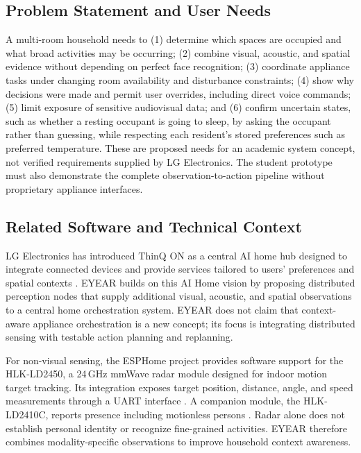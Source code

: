 \documentclass[conference]{IEEEtran}
\begin{document}
\subsection{Problem Statement and User Needs}

A multi-room household needs to (1) determine which spaces are
occupied and what broad activities may be occurring; (2) combine
visual, acoustic, and spatial evidence without depending on
perfect face recognition; (3) coordinate appliance tasks under
changing room availability and disturbance constraints;
(4) show why decisions were made and permit user overrides,
including direct voice commands; (5) limit exposure of sensitive
audiovisual data; and (6) confirm uncertain states, such as whether
a resting occupant is going to sleep, by asking the occupant
rather than guessing, while respecting each resident's stored
preferences such as preferred temperature. These are proposed
needs for an academic system concept, not verified requirements
supplied by LG Electronics. The student prototype must also
demonstrate the complete observation-to-action pipeline without
proprietary appliance interfaces.

\subsection{Related Software and Technical Context}

LG Electronics has introduced ThinQ ON as a central AI home hub
designed to integrate connected devices and provide services
tailored to users' preferences and spatial contexts
\cite{lg2024}. EYEAR builds on this AI Home vision by proposing
distributed perception nodes that supply additional visual,
acoustic, and spatial observations to a central home
orchestration system. EYEAR does not claim that context-aware
appliance orchestration is a new concept; its focus is integrating
distributed sensing with testable action planning and replanning.

For non-visual sensing, the ESPHome project provides software
support for the HLK-LD2450, a 24\,GHz mmWave radar module designed
for indoor motion target tracking. Its integration exposes target
position, distance, angle, and speed measurements through a UART
interface \cite{esphome_ld2450}. A companion module, the
HLK-LD2410C, reports presence including motionless persons
\cite{hlk_ld2410c}. Radar alone does not establish personal
identity or recognize fine-grained activities. EYEAR therefore
combines modality-specific observations to improve household
context awareness.
\end{document}
